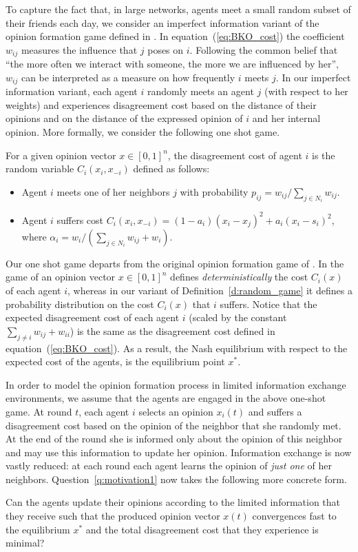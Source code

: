 To capture the fact that, in large networks, agents meet a small random subset
of their friends each day, we consider an imperfect information variant of the
opinion formation game defined in \cite{BKO11}. In equation~(\ref{eq:BKO_cost})
the coefficient $w_{ij}$ measures the influence that $j$ poses on $i$.
Following the common belief that \enquote{the more often we interact with
  someone, the more we are influenced by her}, $w_{ij}$ can be interpreted as a
measure on how frequently $i$ meets $j$. In our imperfect information variant,
each agent $i$ randomly meets an agent $j$ (with respect to her weights) and
experiences disagreement cost based on the distance of their opinions and on
the distance of the expressed opinion of $i$ and her internal opinion.  More
formally, we consider the following one shot game.
%
\begin{definition}\label{d:random_game}
  For a given opinion vector $x \in [0,1]^n$, the disagreement cost of agent
  $i$ is the random variable $C_i(x_i,x_{-i})$ defined as follows:
  \begin{itemize}
    \item Agent $i$ meets one of her neighbors $j$ with probability $p_{ij}=
      w_{ij}/\sum_{j\in N_i}w_{ij}$.
    \item Agent $i$ suffers cost $C_i(x_i , x_{-i}) = (1-a_i)(x_i-x_j)^2 +
      a_i(x_i-s_i)^2$, where $\alpha_i = w_i/(\sum_{j\in N_i}w_{ij}+w_i)$.
  \end{itemize}
\end{definition}
%
Our one shot game departs from the original opinion formation game of
\cite{BKO11}.  In the game of \cite{BKO11} an opinion vector $x\in [0,1]^n$
defines \emph{deterministically} the cost $C_i(x)$ of each agent $i$, whereas
in our variant of Definition~\ref{d:random_game} it defines a probability
distribution on the cost $C_i(x)$ that $i$ suffers.  Notice that the expected
disagreement cost of each agent $i$ (scaled by the constant $\sum_{j\neq
  i}w_{ij}+w_{ii}$) is the same as the disagreement cost defined in
equation~(\ref{eq:BKO_cost}).  As a result, the Nash equilibrium with respect
to the expected cost of the agents, is the equilibrium point $x^*$.

In order to model the opinion formation process in limited information exchange
environments, we assume that the agents are engaged in the above one-shot
game. At round $t$, each agent $i$ selects an opinion $x_i(t)$ and suffers a
disagreement cost based on the opinion of the neighbor that she randomly met.
At the end of the round she is informed only about the opinion of this neighbor
and may use this information to update her opinion. Information
exchange is now vastly reduced: at each round each agent learns the opinion of
\emph{just one} of her neighbors.  Question~\ref{q:motivation1} now takes the
following more concrete form.
%
\begin{question}\label{q:motivation2}
  Can the agents update their opinions according to the limited information
  that they receive such that the produced opinion vector $x(t)$ convergences
  fast to the equilibrium $x^*$ and the total disagreement cost that they
  experience is minimal?
\end{question}

